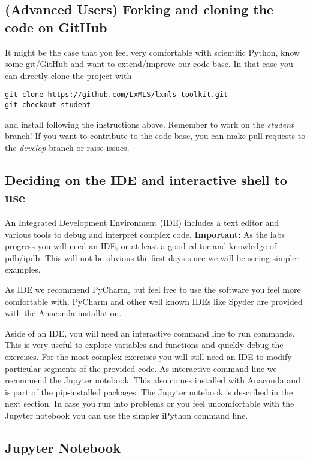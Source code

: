 \subsection{(Advanced Users) Forking and cloning the code on GitHub}

It might be the case that you feel very comfortable with scientific Python, know some git/GitHub and want to extend/improve our code base. In that case you can directly clone the project with

\begin{verbatim}
git clone https://github.com/LxMLS/lxmls-toolkit.git 
git checkout student
\end{verbatim}

\noindent and install following the instructions above. Remember to work on the \textit{student} branch! If you want to contribute to the code-base, you can make pull requests to the \textit{develop} branch or raise issues.

\subsection{Deciding on the IDE and interactive shell to use}

An Integrated Development Environment (IDE) includes a text editor and various tools to debug and interpret complex code. \textbf{Important:} As the labs progress you will need an IDE, or at least a good editor and knowledge of pdb/ipdb. This will not be obvious the first days since we will be seeing simpler examples.

As IDE we recommend PyCharm, but feel free to use the software you feel more comfortable with. PyCharm and other well known IDEs like Spyder are provided with the Anaconda installation.

Aside of an IDE, you will need an interactive command line to run commands. This is very useful to explore variables and functions and quickly debug the exercises. For the most complex exercises you will still need an IDE to modify particular segments of the provided code. As interactive command line we recommend the Jupyter notebook. This also comes installed with Anaconda and is part of the pip-installed packages. The Jupyter notebook is described in the next section. In case you run into problems or you feel uncomfortable with the Jupyter notebook you can use the simpler iPython command line.

\subsection{Jupyter Notebook}


